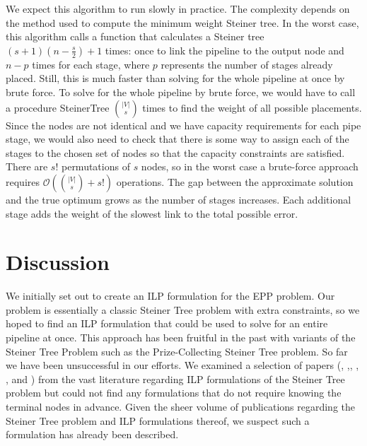 \documentclass{acmart}
\begin{document}
	We expect this algorithm to run slowly in practice. The complexity depends on the method used to compute the minimum weight Steiner tree. In the worst case, this algorithm calls a function that calculates a Steiner tree $(s+1)(n-\frac{s}{2})+1$ times: once to link the pipeline to the output node and $n-p$ times for each stage, where $p$ represents the number of stages already placed. Still, this is much faster than solving for the whole pipeline at once by brute force. To solve for the whole pipeline by brute force, we would have to call a procedure SteinerTree ${|V| \choose s}$ times to find the weight of all possible placements. Since the nodes are not identical and we have capacity requirements for each pipe stage, we would also need to check that there is some way to assign each of the stages to the chosen set of nodes so that the capacity constraints are satisfied. There are $s!$ permutations of $s$ nodes, so in the worst case a brute-force approach requires $\mathcal{O}({|V| \choose s} + s!)$ operations. The gap between the approximate solution and the true optimum grows as the number of stages increases. Each additional stage adds the weight of the slowest link to the total possible error. 
 
 	\section{Discussion}
 	We initially set out to create an ILP formulation for the EPP problem. Our problem is essentially a classic Steiner Tree problem with extra constraints, so we hoped to find an ILP formulation that could be used to solve for an entire pipeline at once. This approach has been fruitful in the past with variants of the Steiner Tree Problem such as the Prize-Collecting Steiner Tree problem. So far we have been unsuccessful in our efforts.  We examined a selection of papers (\cite{Aneja1980AnIL}, \cite{Goemans1993ACO},\cite{Koch1998SolvingST}, \cite{Ljubic2005SolvingTP}, \cite{brandstater15}, and \cite{haouari2010strength}) from the vast literature regarding ILP formulations of the Steiner Tree problem but could not find any formulations that do not require knowing the terminal nodes in advance. Given the sheer volume of publications regarding the Steiner Tree problem and ILP formulations thereof, we suspect such a formulation has already been described.
 	
\end{document}
